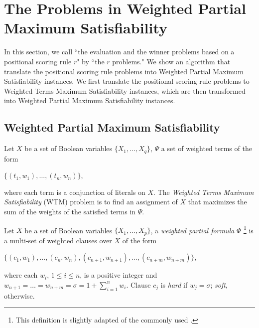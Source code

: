 \section{The Problems in Weighted Partial Maximum Satisfiability}
In this section, we call ``the evaluation and the winner
problems based on a positional scoring rule $r$" by ``the $r$ problems."
We show an algorithm that translate the positional scoring rule problems into 
Weighted Partial Maximum Satisfiability instances.
We first translate the positional scoring rule problems to Weighted
Terms Maximum Satisfiability instances, which are then transformed
into Weighted Partial Maximum Satisfiability instances.

\subsection{Weighted Partial Maximum Satisfiability}
\begin{definition}
	Let $X$ be a set of Boolean variables $\{X_1, \ldots, X_q\}$, 
	$\Psi$ a set of weighted terms of the form
	\begin{center}
  $\{(t_1,w_1), \ldots, (t_n,w_n)\}$, 
	\end{center}
	where each term is a conjunction of literals on $X$.
	The \textit{Weighted Terms Maximum Satisfiability} (WTM) problem
	is to find an assignment of $X$ that 
	maximizes the sum of the weights of the satisfied terms in $\Psi$.
\end{definition}

\begin{definition}
	Let $X$ be a set of Boolean variables $\{X_1, \ldots, X_p\}$, 
	a \textit{weighted partial formula} $\Phi$ 
	\footnote{This definition is slightly adapted of the commonly used
	\cite{ansotegui2010new,ansotegui2009solving}.}
	is a multi-set of weighted clauses over $X$
	of the form 
	\begin{center}
  $\{(c_1,w_1), \ldots, (c_n,w_n), (c_{n+1},w_{n+1}), \ldots, (c_{n+m},w_{n+m})\}$, 
	\end{center}
	where each $w_i$, $1 \leq i \leq n$, is a positive integer and
	$w_{n+1}=\ldots=w_{n+m}=\sigma=1+\sum^n_{i=1} w_i$.  Clause $c_j$
	is \textit{hard} if $w_j=\sigma$; \textit{soft}, otherwise.
\end{definition}

